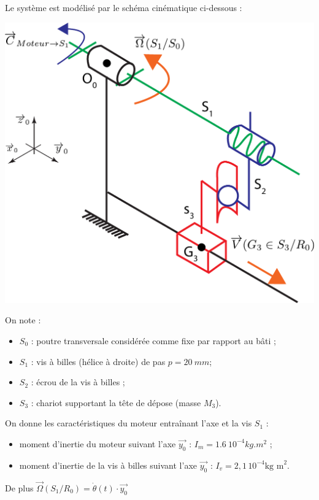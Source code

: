 \documentclass[10pt,fleqn]{article} %
\begin{document}
\begin{multicols}{2}
\begin{multicols}{2}
Le système est modélisé par le schéma cinématique ci-dessous :
\begin{center}
\includegraphics[width=0.7\linewidth]{images/schema_cine_depose_composant.pdf}
\end{center}

On note : 
\begin{itemize}
\item $S_0$ : poutre transversale considérée comme fixe par rapport au bâti ;
\item $S_1$ : vis à billes (hélice à droite) de pas $p=\SI{20}{mm}$;
\item $S_2$ : écrou de la vis à billes ;
\item $S_3$ : chariot supportant la tête de dépose (masse $M_3$).
\end{itemize}


On donne les caractéristiques du moteur entraînant l'axe et la vis $S_1$ :
\begin{itemize}
\item moment d'inertie du moteur suivant l'axe $\overrightarrow{y_0}$ : $I_m = \SI{1,6}{10^{-4} kg.m^2}$ ;
\item moment d'inertie de la vis à billes suivant l'axe $\overrightarrow{y_0}$ : $I_v = 2,1\,  10^{-4}\text{kg m}^2$.
\end{itemize}
De plus $\overrightarrow{\Omega}(S_1/R_0)=\dot{\theta}(t)\cdot \overrightarrow{y_0}$



\end{multicols}
\end{multicols}
\end{document}
